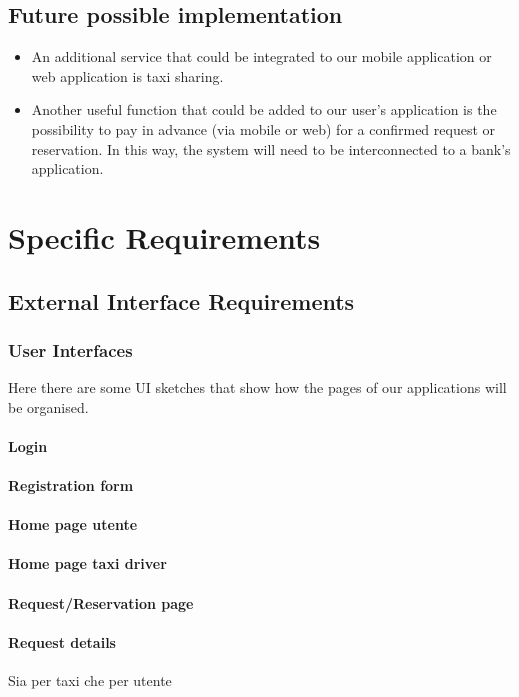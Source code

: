 \documentclass{article}
\begin{document}
   
	\subsection{Future possible implementation}
	    \begin{itemize}
	    \item An additional service that could be integrated to our mobile application or web application is taxi sharing.
	    \item Another useful function that could be added to our user's application is the possibility to pay in advance (via mobile or web) for a confirmed request or reservation.
	    In this way, the system will need to be interconnected to a bank's application.
	    \end{itemize}
\newpage	    
\section{Specific Requirements}
    \subsection{External Interface Requirements}
	    \subsubsection{User Interfaces}
            Here there are some UI sketches that show how the pages of our applications will be organised.
            \paragraph{Login}
            \paragraph{Registration form}
            \paragraph{Home page utente}
            \paragraph{Home page taxi driver}
            \paragraph{Request/Reservation page}
            \paragraph{Request details} Sia per taxi che per utente
\end{document}
